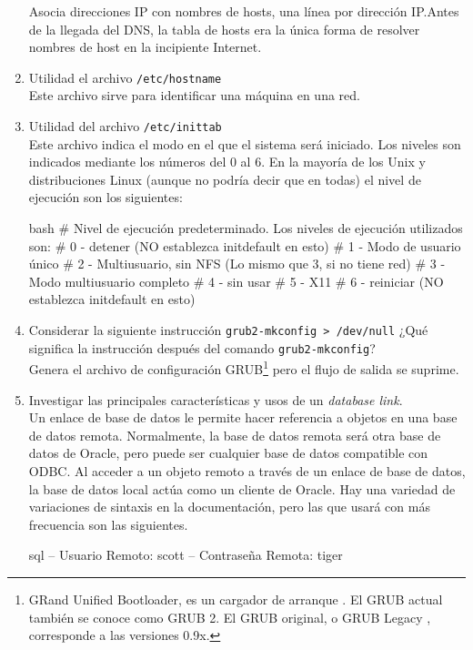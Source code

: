 \documentclass[../main.tex]{subfiles}
\begin{document}
\begin{enumerate}
        Asocia direcciones IP con nombres de hosts, una línea por dirección IP.\@ Antes de la
        llegada del DNS, la tabla de hosts era la única forma de resolver nombres de host
        en la incipiente Internet.\\

  \item Utilidad el archivo \texttt{/etc/hostname}\\

        Este archivo sirve para identificar una máquina en una red\cite{archwiki:domain}.\\

  \item Utilidad del archivo \texttt{/etc/inittab}\\

        Este archivo indica el modo en el que el sistema será iniciado. Los niveles son indicados
        mediante los números del 0 al 6. En la mayoría de los Unix y distribuciones Linux (aunque
        no podría decir que en todas) el nivel de ejecución son los siguientes:

        \begin{code}{bash}
# Nivel de ejecución predeterminado. Los niveles de ejecución utilizados son:
# 0 - detener (NO establezca initdefault en esto)
# 1 - Modo de usuario único
# 2 - Multiusuario, sin NFS (Lo mismo que 3, si no tiene red)
# 3 - Modo multiusuario completo
# 4 - sin usar
# 5 - X11
# 6 - reiniciar (NO establezca initdefault en esto)
        \end{code}

  \item Considerar la siguiente instrucción \texttt{grub2-mkconfig > /dev/null}
        ¿Qué significa la instrucción después del comando \texttt{grub2-mkconfig}?\\

        Genera el archivo de configuración GRUB\footnote{GRand Unified Bootloader,  es
        un cargador de arranque . El GRUB actual también se conoce como GRUB 2. El GRUB original, o
        GRUB Legacy , corresponde a las versiones 0.9x.} pero el flujo de salida se suprime\cite{archwiki:grub}.\\

  \item Investigar las principales características y usos de un \textit{database link}.\\

        Un enlace de base de datos le permite hacer referencia a objetos en una base de datos remota.
        Normalmente, la base de datos remota será otra base de datos de Oracle, pero puede ser cualquier
        base de datos compatible con ODBC.\@
        Al acceder a un objeto remoto a través de un enlace de base de datos, la base de datos local
        actúa como un cliente de Oracle. Hay una variedad de variaciones de sintaxis en la documentación,
        pero las que usará con más frecuencia son las siguientes.
        \begin{code}{sql}
-- Usuario Remoto: scott
-- Contraseña Remota: tiger


\end{code}
\end{enumerate}
\end{document}
